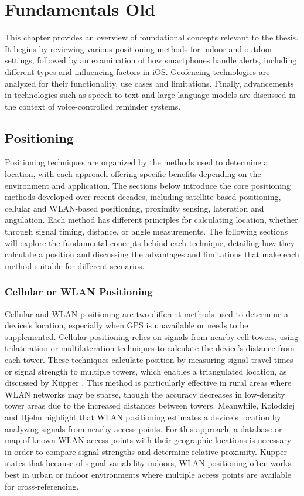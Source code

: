 \chapter{Fundamentals Old}
\label{cha:Fundamentals Old}

This chapter provides an overview of foundational concepts relevant to the thesis. It begins by reviewing various positioning methods for indoor and outdoor settings, followed by an examination of how smartphones handle alerts, including different types and influencing factors in iOS. Geofencing technologies are analyzed for their functionality, use cases and limitations. Finally, advancements in technologies such as speech-to-text and large language models are discussed in the context of voice-controlled reminder systems.

\section{Positioning}
Positioning techniques are organized by the methods used to determine a location, with each approach offering specific benefits depending on the environment and application. The sections below introduce the core positioning methods developed over recent decades, including satellite-based positioning, cellular and WLAN-based positioning, proximity sensing, lateration and angulation. Each method has different principles for calculating location, whether through signal timing, distance, or angle measurements. The following sections will explore the fundamental concepts behind each technique, detailing how they calculate a position and discussing the advantages and limitations that make each method suitable for different scenarios.

\subsection{Cellular or WLAN Positioning}
Cellular and WLAN positioning are two different methods used to determine a device's location, especially when GPS is unavailable or needs to be supplemented. Cellular positioning relies on signals from nearby cell towers, using trilateration or multilateration techniques to calculate the device's distance from each tower. These techniques calculate position by measuring signal travel times or signal strength to multiple towers, which enables a triangulated location, as discussed by K\"upper \cite{kupper2005location}. This method is particularly effective in rural areas where WLAN networks may be sparse, though the accuracy decreases in low-density tower areas due to the increased distances between towers.
Meanwhile, Kolodziej and Hjelm \cite{kolodziej2017local} highlight that WLAN positioning estimates a device's location by analyzing signals from nearby access points. For this approach, a database or map of known WLAN access points with their geographic locations is necessary in order to compare signal strengths and determine relative proximity. K\"upper \cite{kupper2005location} states that because of signal variability indoors, WLAN positioning often works best in urban or indoor environments where multiple access points are available for cross-referencing.

